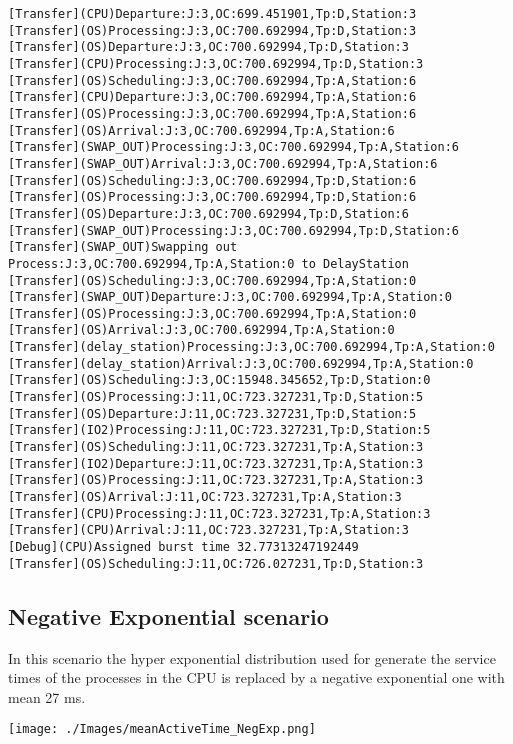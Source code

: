 \documentclass[12pt,a4paper]{article}
\begin{document}
\begin{lstlisting}
[Transfer](CPU)Departure:J:3,OC:699.451901,Tp:D,Station:3
[Transfer](OS)Processing:J:3,OC:700.692994,Tp:D,Station:3
[Transfer](OS)Departure:J:3,OC:700.692994,Tp:D,Station:3
[Transfer](CPU)Processing:J:3,OC:700.692994,Tp:D,Station:3
[Transfer](OS)Scheduling:J:3,OC:700.692994,Tp:A,Station:6
[Transfer](CPU)Departure:J:3,OC:700.692994,Tp:A,Station:6
[Transfer](OS)Processing:J:3,OC:700.692994,Tp:A,Station:6
[Transfer](OS)Arrival:J:3,OC:700.692994,Tp:A,Station:6
[Transfer](SWAP_OUT)Processing:J:3,OC:700.692994,Tp:A,Station:6
[Transfer](SWAP_OUT)Arrival:J:3,OC:700.692994,Tp:A,Station:6
[Transfer](OS)Scheduling:J:3,OC:700.692994,Tp:D,Station:6
[Transfer](OS)Processing:J:3,OC:700.692994,Tp:D,Station:6
[Transfer](OS)Departure:J:3,OC:700.692994,Tp:D,Station:6
[Transfer](SWAP_OUT)Processing:J:3,OC:700.692994,Tp:D,Station:6
[Transfer](SWAP_OUT)Swapping out Process:J:3,OC:700.692994,Tp:A,Station:0 to DelayStation
[Transfer](OS)Scheduling:J:3,OC:700.692994,Tp:A,Station:0
[Transfer](SWAP_OUT)Departure:J:3,OC:700.692994,Tp:A,Station:0
[Transfer](OS)Processing:J:3,OC:700.692994,Tp:A,Station:0
[Transfer](OS)Arrival:J:3,OC:700.692994,Tp:A,Station:0
[Transfer](delay_station)Processing:J:3,OC:700.692994,Tp:A,Station:0
[Transfer](delay_station)Arrival:J:3,OC:700.692994,Tp:A,Station:0
[Transfer](OS)Scheduling:J:3,OC:15948.345652,Tp:D,Station:0
[Transfer](OS)Processing:J:11,OC:723.327231,Tp:D,Station:5
[Transfer](OS)Departure:J:11,OC:723.327231,Tp:D,Station:5
[Transfer](IO2)Processing:J:11,OC:723.327231,Tp:D,Station:5
[Transfer](OS)Scheduling:J:11,OC:723.327231,Tp:A,Station:3
[Transfer](IO2)Departure:J:11,OC:723.327231,Tp:A,Station:3
[Transfer](OS)Processing:J:11,OC:723.327231,Tp:A,Station:3
[Transfer](OS)Arrival:J:11,OC:723.327231,Tp:A,Station:3
[Transfer](CPU)Processing:J:11,OC:723.327231,Tp:A,Station:3
[Transfer](CPU)Arrival:J:11,OC:723.327231,Tp:A,Station:3
[Debug](CPU)Assigned burst time 32.77313247192449
[Transfer](OS)Scheduling:J:11,OC:726.027231,Tp:D,Station:3
\end{lstlisting}

\subsection{Negative Exponential scenario}

In this scenario the hyper exponential distribution used for generate the service times of the processes in the CPU is replaced by a negative exponential one with mean 27 ms. 

\texttt{[image: ./Images/meanActiveTime\_NegExp.png]}
\end{document}

